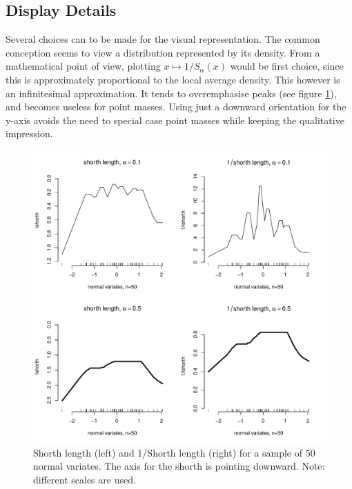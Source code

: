 \documentclass[dvips,12pt,a4paper,twoside]{amsart}
\begin{document}
\subsection{Display Details}
%
Several choices can to be made for the visual representation. 
The common conception seems to view a distribution represented by its density. From a mathematical 
point of view, plotting $x \mapsto 1/S_{\alpha}(x)$ would be first choice, since this is approximately 
proportional to the local average density.  This however is an infinitesimal approximation. It tends to overemphasise peaks (see figure \ref{fig:sinv}), and becomes useless for point masses. Using just a downward orientation for the y-axis 
avoids the need to special case point masses while keeping the qualitative impression.
\begin{figure}[htb]
\includegraphics[width=1.0\linewidth]{TheShorthPlot-sinv}
\caption{Shorth length (left) and 1/Shorth length (right) for a sample of 50 normal variates. The axis for the shorth is pointing downward. Note: different scales are used.}
\label{fig:sinv}
\end{figure}
%
\end{document}
